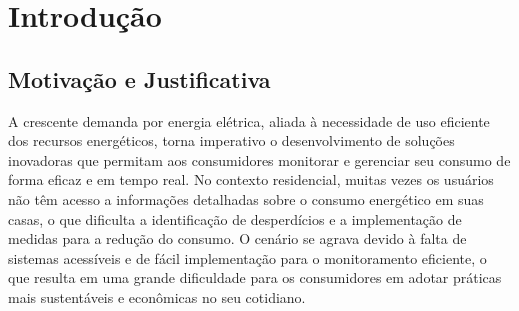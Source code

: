 \chapter{Introdução}
\label{chap:intro} %





\section{Motivação e Justificativa}
\label{sec:motivacao}

A crescente demanda por energia elétrica, aliada à necessidade de uso eficiente dos recursos energéticos, torna imperativo o desenvolvimento de soluções inovadoras que permitam aos consumidores monitorar e gerenciar seu consumo de forma eficaz e em tempo real. No contexto residencial, muitas vezes os usuários não têm acesso a informações detalhadas sobre o consumo energético em suas casas, o que dificulta a identificação de desperdícios e a implementação de medidas para a redução do consumo. O cenário se agrava devido à falta de sistemas acessíveis e de fácil implementação para o monitoramento eficiente, o que resulta em uma grande dificuldade para os consumidores em adotar práticas mais sustentáveis e econômicas no seu cotidiano. 

